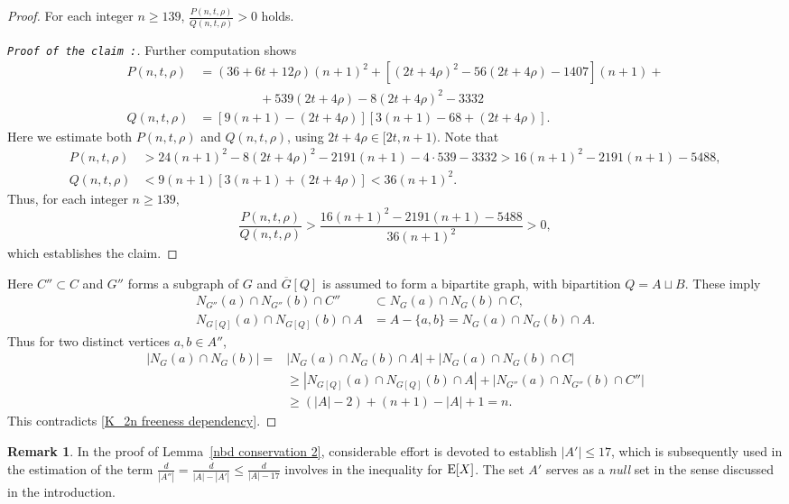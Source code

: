 \documentclass[reqno,10pt]{amsart}
\theoremstyle{definition}
\newtheorem*{remark}{Remark}
\newcommand{\Ex}{\ensuremath{{\textnormal{E}}}}
\begin{document}
\begin{proof}
 For each integer $n\geq139$, $\frac{P(n,t,\rho)}{Q(n,t,\rho)}>0$ holds.
\begin{proof}[\tt{Proof of the claim} :]\renewcommand{\qedsymbol}{}
Further computation shows 
\begin{align*}
 P(n,t,\rho)&=(36+6t+12\rho)(n+1)^{2}+[(2t+4\rho)^{2}-56(2t+4\rho)-1407](n+1)+\\
 &\hspace{2cm}+539(2t+4\rho)-8(2t+4\rho)^{2}-3332\\
Q(n,t,\rho)&=[9(n+1)-(2t+4\rho)][3(n+1)-68+(2t+4\rho)].
\end{align*}
Here we estimate both $ P(n,t,\rho)$ and $Q(n,t,\rho)$, using $2t+4\rho\in[2t,n+1)$. Note that
\begin{align*}
 P(n,t,\rho)&>24(n+1)^{2}-8(2t+4\rho)^{2}-2191(n+1)-4\cdot 539-3332>16(n+1)^{2}-2191(n+1)-5488,\\
 Q(n,t,\rho)&<9(n+1)[3(n+1)+(2t+4\rho)]<36(n+1)^{2}.
\end{align*}
Thus, for each integer $n\geq139$,
\begin{equation*}
 \frac{P(n,t,\rho)}{Q(n,t,\rho)}>\frac{16(n+1)^{2}-2191(n+1)-5488}{36(n+1)^{2}}>0,  
\end{equation*}
which establishes the claim.
\end{proof}
Here $C''\subset C$ and $G''$ forms a subgraph of $G$ and $\overline{G}[Q]$ is assumed to form a bipartite graph, with bipartition $Q=A\sqcup B$. These imply
\begin{align*}
 N_{G''}(a)\cap N_{G''}(b)\cap C''&\subset N_{G}(a)\cap N_{G}(b)\cap C,\\
 N_{G[Q]}(a)\cap N_{G[Q]}(b)\cap A&=A-\{a,b\}=N_{G}(a)\cap N_{G}(b)\cap A. 
\end{align*}
Thus for two distinct vertices $a,b\in A''$,
\begin{align*}
|N_{G}(a)\cap N_{G}(b)|=&|N_{G}(a)\cap N_{G}(b)\cap A|+|N_{G}(a)\cap N_{G}(b)\cap C|\\
&\geq |N_{G[Q]}(a)\cap N_{G[Q]}(b)\cap A|+|N_{G''}(a)\cap N_{G''}(b)\cap C''|\\
&\geq (|A|-2)+(n+1)-|A|+1=n.
\end{align*}
This contradicts \eqref{K_2n freeness dependency}.
\end{proof}


\begin{remark}
In the proof of Lemma~\ref{nbd conservation 2}, considerable effort is devoted to establish $|A'|\leq17$, which is subsequently used in the estimation of the term $\frac{d}{|A''|}=\frac{d}{|A|-|A'|}\leq\frac{d}{|A|-17}$ involves in the inequality for $\Ex[X]$.  The set $A'$ serves as a \emph{null} set in the sense discussed in the introduction.
\end{remark}
\end{document}
